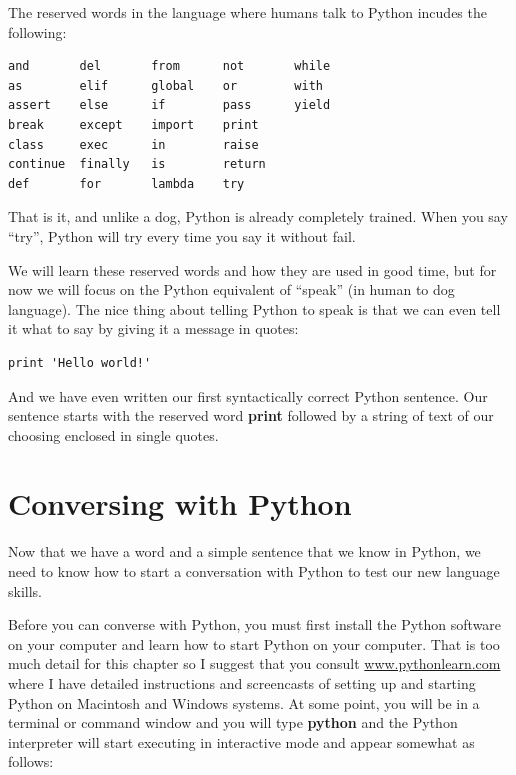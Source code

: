 The reserved words in the language where humans talk to 
Python incudes the following:

\beforeverb
\begin{verbatim}
and       del       from      not       while    
as        elif      global    or        with     
assert    else      if        pass      yield    
break     except    import    print              
class     exec      in        raise              
continue  finally   is        return             
def       for       lambda    try
\end{verbatim}
\afterverb
%
That is it, and unlike a dog, Python is already completely trained.
When you say ``try'', Python will try every time you say it without
fail.

We will learn these reserved words and how they are used in good time,
but for now we will focus on the Python equivalent of ``speak'' (in 
human to dog language).  The nice thing about telling Python to speak
is that we can even tell it what to say by giving it a message in quotes:

\beforeverb
\begin{verbatim}
print 'Hello world!'
\end{verbatim}
\afterverb

And we have even written our first syntactically correct Python sentence.
Our sentence starts with the reserved word {\bf print} followed
by a string of text of our choosing enclosed in single quotes.

\section{Conversing with Python}

Now that we have a word and a simple sentence that we know in Python,
we need to know how to start a conversation with Python to test 
our new language skills.

Before you can converse with Python, you must first install the Python
software on your computer and learn how to start Python on your 
computer.  That is too much detail for this chapter so I suggest
that you consult \url{www.pythonlearn.com} where I have detailed
instructions and screencasts of setting up and starting Python 
on Macintosh and Windows systems.  At some point, you will be in 
a terminal or command window and you will type {\bf python} and 
the Python interpreter will start executing in interactive mode
and appear somewhat as follows:

